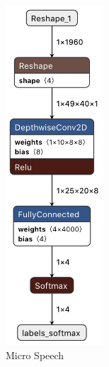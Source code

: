 \documentclass{tum-presentation}
\begin{document}
\begin{frame}
\begin{figure}[h]
\begin{subfigure}[b]{0.3\textwidth}
         \includegraphics[width=0.4\textwidth]{figures/micro_speech_graph.png}
         \caption{Micro Speech}
         \label{fig:netron_mirco_speech}
     \end{subfigure}
     \hfill
     \begin{subfigure}[b]{0.3\textwidth}
         \centering

\end{subfigure}
\end{figure}
\end{frame}
\end{document}
